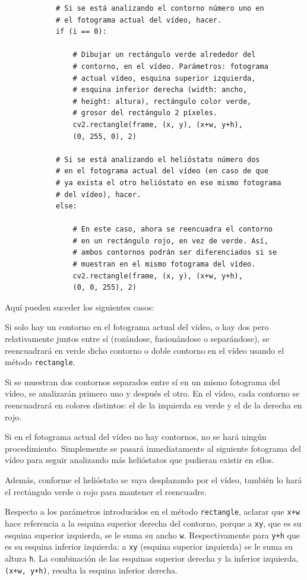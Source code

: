 \begin{lstlisting}
            # Si se está analizando el contorno número uno en
            # el fotograma actual del vídeo, hacer.
            if (i == 0):

                # Dibujar un rectángulo verde alrededor del
                # contorno, en el vídeo. Parámetros: fotograma
                # actual vídeo, esquina superior izquierda,
                # esquina inferior derecha (width: ancho,
                # height: altura), rectángulo color verde,
                # grosor del rectángulo 2 píxeles.
                cv2.rectangle(frame, (x, y), (x+w, y+h),
                (0, 255, 0), 2)

            # Si se está analizando el helióstato número dos
            # en el fotograma actual del vídeo (en caso de que
            # ya exista el otro helióstato en ese mismo fotograma
            # del vídeo), hacer.
            else:

                # En este caso, ahora se reencuadra el contorno
                # en un rectángulo rojo, en vez de verde. Así,
                # ambos contornos podrán ser diferenciados si se
                # muestran en el mismo fotograma del vídeo.
                cv2.rectangle(frame, (x, y), (x+w, y+h),
                (0, 0, 255), 2)
\end{lstlisting}

Aquí pueden suceder los siguientes casos:

Si solo hay un contorno en el fotograma actual del vídeo, o hay dos pero relativamente juntos entre sí (rozándose, fusionándose o separándose), se reencuadrará en verde dicho contorno o doble contorno en el vídeo usando el método \verb|rectangle|.

Si se muestran dos contornos separados entre sí en un mismo fotograma del vídeo, se analizarán primero uno y después el otro. En el vídeo, cada contorno se reencuadrará en colores distintos: el de la izquierda en verde y el de la derecha en rojo.

Si en el fotograma actual del vídeo no hay contornos, no se hará ningún procedimiento. Simplemente se pasará inmediatamente al siguiente fotograma del vídeo para seguir analizando más helióstatos que pudieran existir en ellos.

Además, conforme el helióstato se vaya desplazando por el vídeo, también lo hará el rectángulo verde o rojo para mantener el reencuadre.

Respecto a los parámetros introducidos en el método \verb|rectangle|, aclarar que \verb|x+w| hace referencia a la esquina superior derecha del contorno, porque a \verb|xy|, que es su esquina superior izquierda, se le suma su ancho \verb|w|. Respectivamente para \verb|y+h| que es su esquina inferior izquierda: a \verb|xy| (esquina superior izquierda) se le suma su altura \verb|h|. La combinación de las esquinas superior derecha y la inferior izquierda, \verb|(x+w, y+h)|, resulta la esquina inferior derecha.

